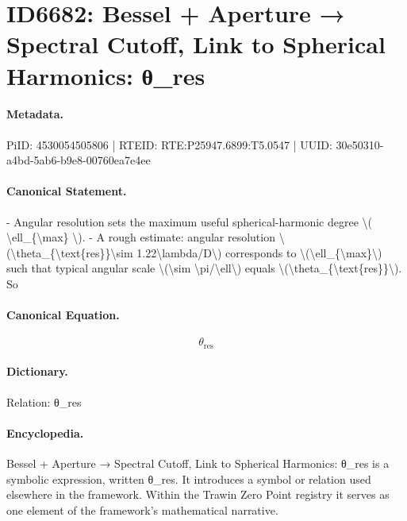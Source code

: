 \section*{ID6682: Bessel + Aperture → Spectral Cutoff, Link to Spherical Harmonics: θ\_res}
\paragraph{Metadata.}
PiID: 4530054505806 | RTEID: RTE:P25947.6899:T5.0547 | UUID: 30e50310-a4bd-5ab6-b9e8-00760ea7e4ee

\paragraph{Canonical Statement.}
- Angular resolution sets the maximum useful spherical-harmonic degree \textbackslash{}( \textbackslash{}ell\_\{\textbackslash{}max\} \textbackslash{}). - A rough estimate: angular resolution \textbackslash{}(\textbackslash{}theta\_\{\textbackslash{}text\{res\}\}\textbackslash{}sim 1.22\textbackslash{}lambda/D\textbackslash{}) corresponds to \textbackslash{}(\textbackslash{}ell\_\{\textbackslash{}max\}\textbackslash{}) such that typical angular scale \textbackslash{}(\textbackslash{}sim \textbackslash{}pi/\textbackslash{}ell\textbackslash{}) equals \textbackslash{}(\textbackslash{}theta\_\{\textbackslash{}text\{res\}\}\textbackslash{}). So

\paragraph{Canonical Equation.}
\[
\theta_{\text{res}}
\]

\paragraph{Dictionary.}
Relation: θ\_res

\paragraph{Encyclopedia.}
Bessel + Aperture → Spectral Cutoff, Link to Spherical Harmonics: θ\_res is a symbolic expression, written θ\_res. It introduces a symbol or relation used elsewhere in the framework. Within the Trawin Zero Point registry it serves as one element of the framework's mathematical narrative.
